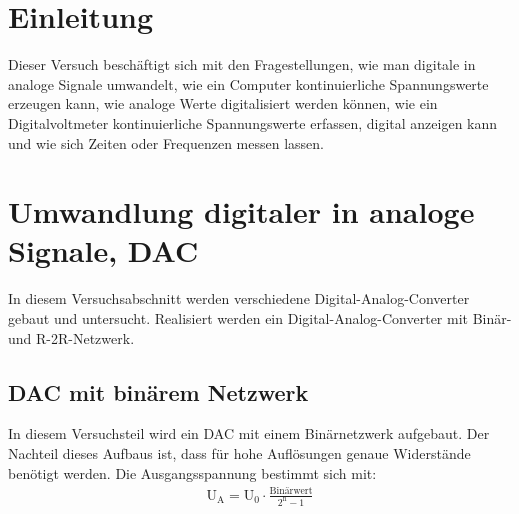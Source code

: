 \documentclass[12pt,a4paper]{article}
\begin{document}
\newpage
\tableofcontents
\newpage
\section{Einleitung}

Dieser Versuch beschäftigt sich mit den Fragestellungen, wie man digitale in analoge Signale umwandelt, wie ein Computer kontinuierliche Spannungswerte erzeugen kann, wie analoge Werte digitalisiert werden können, wie ein Digitalvoltmeter kontinuierliche Spannungswerte erfassen, digital anzeigen kann und wie sich Zeiten oder Frequenzen messen lassen.

\section{Umwandlung digitaler in analoge Signale, DAC}

In diesem Versuchsabschnitt werden verschiedene Digital-Analog-Converter gebaut und untersucht. Realisiert werden ein Digital-Analog-Converter mit Binär- und R-2R-Netzwerk. 

\subsection{DAC mit binärem Netzwerk}

In diesem Versuchsteil wird ein DAC mit einem Binärnetzwerk aufgebaut. Der Nachteil dieses Aufbaus ist, dass für hohe Auflösungen genaue Widerstände benötigt werden. Die Ausgangsspannung bestimmt sich mit:
\begin{align}
\text{U}_\text{A}=\text{U}_0 \cdot \frac{\text{Binärwert}}{2^\text{n}-1}
\label{eqn:binaer}
\end{align}
\end{document}
